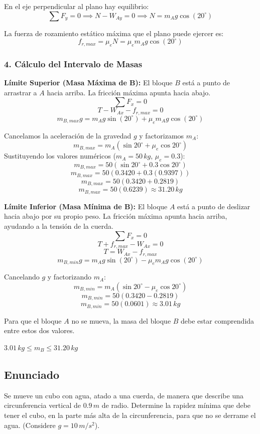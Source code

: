 \documentclass[12pt, a4paper]{article}
\begin{document}
En el eje perpendicular al plano hay equilibrio:
$$ \sum F_y = 0 \implies N - W_{Ay} = 0 \implies N = m_A g \cos(20^\circ) $$

La fuerza de rozamiento estático máxima que el plano puede ejercer es:
$$ f_{r,max} = \mu_e N = \mu_e m_A g \cos(20^\circ) $$

\subsubsection*{4. Cálculo del Intervalo de Masas}

\textbf{Límite Superior (Masa Máxima de B):}
El bloque $B$ está a punto de arrastrar a $A$ hacia arriba. La fricción máxima apunta hacia abajo.
$$ \sum F_x = 0 $$
$$ T - W_{Ax} - f_{r,max} = 0 $$
$$ m_{B,max} g = m_A g \sin(20^\circ) + \mu_e m_A g \cos(20^\circ) $$

Cancelamos la aceleración de la gravedad $g$ y factorizamos $m_A$:
$$ m_{B,max} = m_A (\sin 20^\circ + \mu_e \cos 20^\circ) $$
Sustituyendo los valores numéricos ($m_A = 50\,\si{kg}$, $\mu_e = 0.3$):
$$ m_{B,max} = 50 (\sin 20^\circ + 0.3 \cos 20^\circ) $$
$$ m_{B,max} = 50 (0.3420 + 0.3(0.9397)) $$
$$ m_{B,max} = 50 (0.3420 + 0.2819) $$
$$ m_{B,max} = 50 (0.6239) \approx 31.20\,\si{kg} $$

\textbf{Límite Inferior (Masa Mínima de B):}
El bloque $A$ está a punto de deslizar hacia abajo por su propio peso. La fricción máxima apunta hacia arriba, ayudando a la tensión de la cuerda.
$$ \sum F_x = 0 $$
$$ T + f_{r,max} - W_{Ax} = 0 $$
$$ T = W_{Ax} - f_{r,max} $$
$$ m_{B,min} g = m_A g \sin(20^\circ) - \mu_e m_A g \cos(20^\circ) $$

Cancelando $g$ y factorizando $m_A$:
$$ m_{B,min} = m_A (\sin 20^\circ - \mu_e \cos 20^\circ) $$
$$ m_{B,min} = 50 (0.3420 - 0.2819) $$
$$ m_{B,min} = 50 (0.0601) \approx 3.01\,\si{kg} $$

Para que el bloque $A$ no se mueva, la masa del bloque $B$ debe estar comprendida entre estos dos valores.

\begin{tcolorbox}[colback=green!5!white, colframe=green!50!black, title=Respuesta Final]
\centering \Large $3.01\,\si{kg} \leq m_B \leq 31.20\,\si{kg}$
\end{tcolorbox}

\newpage

\subsection*{Enunciado}
Se mueve un cubo con agua, atado a una cuerda, de manera que describe una circunferencia vertical de $0.9 \, \si{m}$ de radio. Determine la rapidez mínima que debe tener el cubo, en la parte más alta de la circunferencia, para que no se derrame el agua. (Considere $g = 10 \, \si{m/s^2}$).
\end{document}
